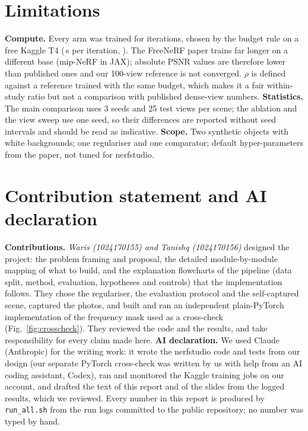 \section{Limitations}
\textbf{Compute.} Every arm was trained for \Iters{} iterations, chosen by the budget rule on a free Kaggle T4 (\SPerIter\,s per iteration, \AmpText). The FreeNeRF paper trains far longer on a different base (mip-NeRF in JAX); absolute PSNR values are therefore lower than published ones and our 100-view reference is not converged. $\rho$ is defined against a reference trained with the same budget, which makes it a fair within-study ratio but not a comparison with published dense-view numbers.
\textbf{Statistics.} The main comparison uses 3 seeds and 25 test views per scene; the ablation and the view sweep use one seed, so their differences are reported without seed intervals and should be read as indicative.
\textbf{Scope.} Two synthetic objects with white backgrounds; one regulariser and one comparator; default hyper-parameters from the paper, not tuned for nerfstudio.

\section{Contribution statement and AI declaration}
\textbf{Contributions.} \emph{Waris (1024170155) and Tanishq (1024170156)} designed the project: the problem framing and proposal, the detailed module-by-module mapping of what to build, and the explanation flowcharts of the pipeline (data split, method, evaluation, hypotheses and controls) that the implementation follows. They chose the regulariser, the evaluation protocol and the self-captured scene, captured the photos, and built and ran an independent plain-PyTorch implementation of the frequency mask used as a cross-check (Fig.~\ref{fig:crosscheck}). They reviewed the code and the results, and take responsibility for every claim made here.
\textbf{AI declaration.} We used Claude (Anthropic) for the writing work: it wrote the nerfstudio code and tests from our design (our separate PyTorch cross-check was written by us with help from an AI coding assistant, Codex), ran and monitored the Kaggle training jobs on our account, and drafted the text of this report and of the slides from the logged results, which we reviewed. Every number in this report is produced by \texttt{run\_all.sh} from the run logs committed to the public repository; no number was typed by hand.
